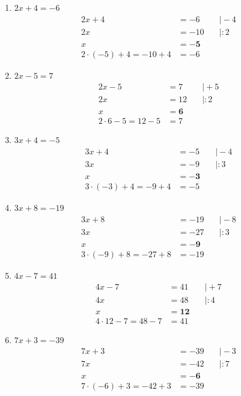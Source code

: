 \documentclass[a4paper,10pt]{article} %
\begin{document}
\begin{enumerate}[label=\alph*)]

  \item \(2x + 4 = -6\)
  \[
    \begin{aligned}
      2x + 4 &= -6 &\quad\big| - 4 \\
      2x &= -10 &\quad\big| : 2 \\
      x &= \mathbf{-5} \\
      2 \cdot (-5) + 4 = -10 + 4 &= -6
    \end{aligned}
  \]

  \item \(2x - 5 = 7\)
  \[
    \begin{aligned}
      2x - 5 &= 7 &\quad\big| + 5 \\
      2x &= 12 &\quad\big| : 2 \\
      x &= \mathbf{6} \\
      2 \cdot 6 - 5 = 12 - 5 &= 7
    \end{aligned}
  \]

  \item \(3x + 4 = -5\)
  \[
    \begin{aligned}
      3x + 4 &= -5 &\quad\big| - 4 \\
      3x &= -9 &\quad\big| : 3 \\
      x &= \mathbf{-3} \\
      3 \cdot (-3) + 4 = -9 + 4 &= -5
    \end{aligned}
  \]

  \item \(3x + 8 = -19\)
  \[
    \begin{aligned}
      3x + 8 &= -19 &\quad\big| - 8 \\
      3x &= -27 &\quad\big| : 3 \\
      x &= \mathbf{-9} \\
      3 \cdot (-9) + 8 = -27 + 8 &= -19
    \end{aligned}
  \]

  \item \(4x - 7 = 41\)
  \[
    \begin{aligned}
      4x - 7 &= 41 &\quad\big| + 7 \\
      4x &= 48 &\quad\big| : 4 \\
      x &= \mathbf{12} \\
      4 \cdot 12 - 7 = 48 - 7 &= 41
    \end{aligned}
  \]

  \item \(7x + 3 = -39\)
  \[
    \begin{aligned}
      7x + 3 &= -39 &\quad\big| - 3 \\
      7x &= -42 &\quad\big| : 7 \\
      x &= \mathbf{-6} \\
      7 \cdot (-6) + 3 = -42 + 3 &= -39
    \end{aligned}
  \]


\end{enumerate}
\end{document}
